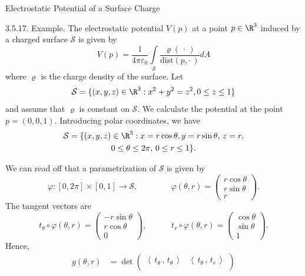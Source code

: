 \documentclass[smaller,hyperref={CJKbookmarks=true}]{beamer}
\newcommand{\scp}[2]{\left\langle\,#1\,,\,#2\,\right\rangle} \newcommand{\scpp}{\langle\,\cdot\,,\,\cdot\,\rangle}
\begin{document}
\begin{frame}{Electrostatic Potential of a Surface Charge}
\begin{spacing}{1}
\alert{3.5.17. Example.} The electrostatic potential $V(p)$ at a point $p\in\R^3$ induced by a charged surface $\mathcal{S}$ is given by
\[V(p)=\frac{1}{4\pi\varepsilon_0}\int\limits_\mathcal{S}
\frac{\varrho(\,\cdot\,)}{\text{dist}(p,\cdot\,)}dA\]
where $\varrho$ is the charge density of the surface. Let
\[\mathcal{S}=\{(x,y,z)\in\R^3:x^2+y^2=z^2,0\leq z\leq1\}\]
and assume that $\varrho$ is constant on $\mathcal{S}$. We calculate the potential at the point $p=(0,0,1)$. Introducing polar coordinates, we have
\begin{multline*}
  \mathcal{S}=\{(x,y,z)\in\R^3:x=r\cos\theta,
  y=r\sin\theta,\,z=r, \\
  0\leq\theta\leq2\pi,\,0\leq r\leq1\}.
\end{multline*}
\end{spacing}
\newpage
\begin{spacing}{0.8}
We can read of{}f that a parametrization of $\mathcal{S}$ is given by
\[\varphi:[0,2\pi]\times[0,1]\to\mathcal{S},
\qquad\qquad\varphi(\theta,r)=\begin{pmatrix}
                                r\cos\theta \\
                                r\sin\theta \\
                                r
                              \end{pmatrix}.\]
The tangent vectors are
\[t_\theta\circ\varphi(\theta,r)=\begin{pmatrix}
                                   -r\sin\theta \\
                                   r\cos\theta \\
                                   0
                                 \end{pmatrix},
\qquad\quad t_r\circ\varphi(\theta,r)=\begin{pmatrix}
                            \cos\theta \\
                            \sin\theta \\
                            1
                          \end{pmatrix}.\]
Hence,
\begin{equation*}
  \begin{split}
     g(\theta,r) &=\det\left.\begin{pmatrix}
                         \scp{t_\theta}{t_\theta} & \scp{t_\theta}{t_r} \\[2.5pt]

\end{pmatrix}
\end{split}
\end{equation*}
\end{spacing}
\end{frame}
\end{document}
